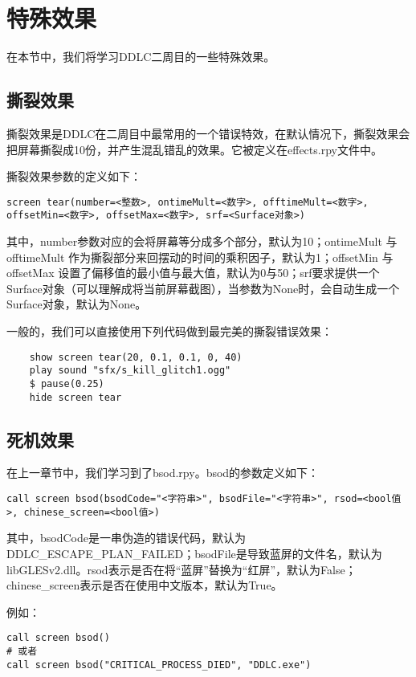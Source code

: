 \documentclass[../../Main.tex]{subfiles}
\begin{document}
\section{特殊效果}

在本节中，我们将学习DDLC二周目的一些特殊效果。

\subsection{撕裂效果}
撕裂效果是DDLC在二周目中最常用的一个错误特效，在默认情况下，撕裂效果会把屏幕撕裂成10份，并产生混乱错乱的效果。它被定义在effects.rpy文件中。

撕裂效果参数的定义如下：
\begin{lstlisting}
screen tear(number=<整数>, ontimeMult=<数字>, offtimeMult=<数字>, offsetMin=<数字>, offsetMax=<数字>, srf=<Surface对象>)
\end{lstlisting}

其中，number参数对应的会将屏幕等分成多个部分，默认为10；ontimeMult 与 offtimeMult 作为撕裂部分来回摆动的时间的乘积因子，默认为1；offsetMin 与 offsetMax 设置了偏移值的最小值与最大值，默认为0与50；srf要求提供一个Surface对象（可以理解成将当前屏幕截图），当参数为None时，会自动生成一个Surface对象，默认为None。

一般的，我们可以直接使用下列代码做到最完美的撕裂错误效果：
\begin{lstlisting}
    show screen tear(20, 0.1, 0.1, 0, 40)
    play sound "sfx/s_kill_glitch1.ogg"
    $ pause(0.25)
    hide screen tear
\end{lstlisting}

\subsection{死机效果}
在上一章节中，我们学习到了bsod.rpy。bsod的参数定义如下：

\begin{lstlisting}
call screen bsod(bsodCode="<字符串>", bsodFile="<字符串>", rsod=<bool值>, chinese_screen=<bool值>)
\end{lstlisting}

其中，bsodCode是一串伪造的错误代码，默认为DDLC\_ESCAPE\_PLAN\_FAILED；bsodFile是导致蓝屏的文件名，默认为libGLESv2.dll。rsod表示是否在将“蓝屏”替换为“红屏”，默认为False；chinese\_screen表示是否在使用中文版本，默认为True。

例如：
\begin{lstlisting}
call screen bsod()
# 或者
call screen bsod("CRITICAL_PROCESS_DIED", "DDLC.exe")
\end{lstlisting}
\end{document}
